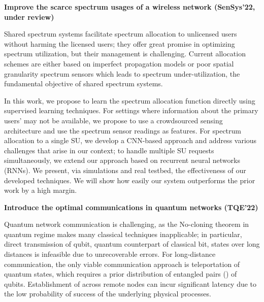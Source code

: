\vspace{6pt}\noindent \textbf{Improve the scarce spectrum usages of a wireless network (SenSys'22, under review)}

Shared spectrum systems facilitate spectrum allocation to unlicensed users without harming the licensed users; they offer great promise in optimizing spectrum utilization, but their management is challenging.
Current allocation schemes are either based on imperfect propagation models or poor spatial granularity spectrum sensors which leads to spectrum under-utilization,  the fundamental objective of shared
spectrum systems.

In this work, we propose to learn the spectrum allocation function directly using supervised learning techniques. 
For settings where information about the primary users' may not be available, we propose to use a crowdsourced sensing architecture and use the spectrum sensor readings as features. 
For spectrum allocation to a single SU, we develop a CNN-based approach
and address various challenges that arise in our context; to handle multiple SU
requests simultaneously, we extend our approach based on recurrent neural networks (RNNs).
We present, via simulations and real testbed, the effectiveness of our developed techniques. We will show how easily our system outperforms the prior work by a high margin.


\vspace{6pt}\noindent \textbf{Introduce the optimal communications in quantum networks (TQE'22)}

Quantum network communication is challenging, as the No-cloning theorem in quantum regime makes many classical techniques inapplicable; in particular, 
direct transmission of qubit, quantum counterpart of classical bit, states over long distances is infeasible
due to unrecoverable errors.
For long-distance communication, the only viable communication approach is teleportation of quantum states, which requires a prior distribution of entangled pairs (\epss) of qubits.
Establishment of \epss across remote nodes can incur significant latency due to the low probability of success of the underlying physical processes. 

